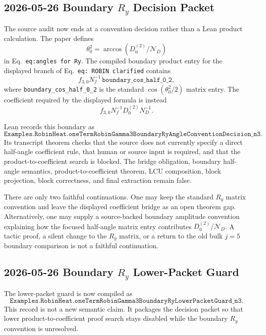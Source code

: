 \subsection{2026-05-26 Boundary \(R_y\) Decision Packet}

The source audit now ends at a convention decision rather than a Lean product
calculation.  The paper defines
\[
  \theta_0^2=\arccos(D_0^{(2)}/\mathcal{N}_D)
\]
in Eq.~\texttt{eq:angles for Ry}.  The compiled boundary product entry for
the displayed branch of Eq.~\texttt{eq: ROBIN clarified} contains
\[
  f_{3,0}N_f^{-1}\,\texttt{boundary\_cos\_half\_0\_2},
\]
where \texttt{boundary\_cos\_half\_0\_2} is the standard
\(\cos(\theta_0^2/2)\) matrix entry.  The coefficient required by the
displayed formula is instead
\[
  f_{3,0}N_f^{-1}D_0^{(2)}N_D^{-1}.
\]

Lean records this boundary as
\[
  \texttt{Examples.RobinHeat.oneTermRobinGamma3BoundaryRyAngleConventionDecision\_n3}.
\]
Its transcript theorem checks that the source does not currently specify a
direct half-angle coefficient rule, that human or source input is required,
and that the product-to-coefficient search is blocked.  The bridge obligation,
boundary half-angle semantics, product-to-coefficient theorem, LCU
composition, block projection, block correctness, and final extraction remain
false.

There are only two faithful continuations.  One may keep the standard
\(R_y\) matrix convention and leave the displayed coefficient bridge as an
open theorem gap.  Alternatively, one may supply a source-backed boundary
amplitude convention explaining how the focused half-angle matrix entry
contributes \(D_0^{(2)}/\mathcal{N}_D\).  A tactic proof, a silent change to
the \(R_y\) matrix, or a return to the old bulk \(j=5\) boundary comparison is
not a faithful continuation.

\subsection{2026-05-26 Boundary \(R_y\) Lower-Packet Guard}

The lower-packet guard is now compiled as
\[
  \texttt{Examples.RobinHeat.oneTermRobinGamma3BoundaryRyLowerPacketGuard\_n3}.
\]
This record is not a new semantic claim.  It packages the decision packet so
that lower product-to-coefficient proof search stays disabled while the
boundary \(R_y\) convention is unresolved.

